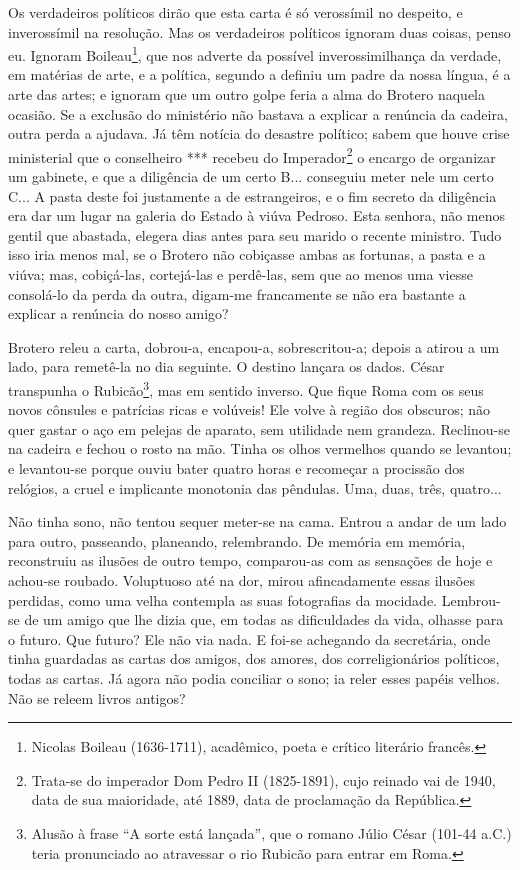 Os verdadeiros políticos dirão que esta carta é só verossímil no
despeito, e inverossímil na resolução. Mas os verdadeiros políticos
ignoram duas coisas, penso eu. Ignoram Boileau\footnote{Nicolas Boileau
  (1636-1711), acadêmico, poeta e crítico literário francês.}, que nos
adverte da possível inverossimilhança da verdade, em matérias de arte, e
a política, segundo a definiu um padre da nossa língua, é a arte das
artes; e ignoram que um outro golpe feria a alma do Brotero naquela
ocasião. Se a exclusão do ministério não bastava a explicar a renúncia
da cadeira, outra perda a ajudava. Já têm notícia do desastre político;
sabem que houve crise ministerial que o conselheiro *** recebeu do
Imperador\footnote{Trata-se do imperador Dom Pedro II (1825-1891), cujo
  reinado vai de 1940, data de sua maioridade, até 1889, data de
  proclamação da República.} o encargo de organizar um gabinete, e que a
diligência de um certo B... conseguiu meter nele um certo C... A pasta
deste foi justamente a de estrangeiros, e o fim secreto da diligência
era dar um lugar na galeria do Estado à viúva Pedroso. Esta senhora, não
menos gentil que abastada, elegera dias antes para seu marido o recente
ministro. Tudo isso iria menos mal, se o Brotero não cobiçasse ambas as
fortunas, a pasta e a viúva; mas, cobiçá-las, cortejá-las e perdê-las,
sem que ao menos uma viesse consolá-lo da perda da outra, digam-me
francamente se não era bastante a explicar a renúncia do nosso amigo?

Brotero releu a carta, dobrou-a, encapou-a, sobrescritou-a; depois a
atirou a um lado, para remetê-la no dia seguinte. O destino lançara os
dados. César transpunha o Rubicão\footnote{Alusão à frase ``A sorte está
  lançada'', que o romano Júlio César (101-44 a.C.) teria pronunciado ao
  atravessar o rio Rubicão para entrar em Roma.}, mas em sentido
inverso. Que fique Roma com os seus novos cônsules e patrícias ricas e
volúveis! Ele volve à região dos obscuros; não quer gastar o aço em
pelejas de aparato, sem utilidade nem grandeza. Reclinou-se na cadeira e
fechou o rosto na mão. Tinha os olhos vermelhos quando se levantou; e
levantou-se porque ouviu bater quatro horas e recomeçar a procissão dos
relógios, a cruel e implicante monotonia das pêndulas. Uma, duas, três,
quatro...

Não tinha sono, não tentou sequer meter-se na cama. Entrou a andar de um
lado para outro, passeando, planeando, relembrando. De memória em
memória, reconstruiu as ilusões de outro tempo, comparou-as com as
sensações de hoje e achou-se roubado. Voluptuoso até na dor, mirou
afincadamente essas ilusões perdidas, como uma velha contempla as suas
fotografias da mocidade. Lembrou-se de um amigo que lhe dizia que, em
todas as dificuldades da vida, olhasse para o futuro. Que futuro? Ele
não via nada. E foi-se achegando da secretária, onde tinha guardadas as
cartas dos amigos, dos amores, dos correligionários políticos, todas as
cartas. Já agora não podia conciliar o sono; ia reler esses papéis
velhos. Não se releem livros antigos?

